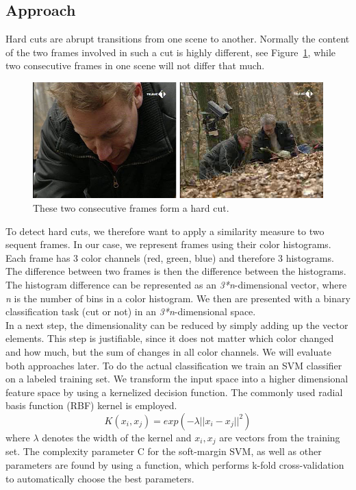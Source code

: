 \subsection{Approach}
\label{sec:hard_cut_approach}

Hard cuts are abrupt transitions from one scene to another. 
Normally the content of the two frames involved in such a cut is highly different, see Figure~\ref{fig:hard_cut_example}, while two consecutive frames in one scene will not differ that much. 

\begin{figure}
	\centering
	\includegraphics[scale=.7]{images/hard_cut_example.png}
	\caption{These two consecutive frames form a hard cut.}
	\label{fig:hard_cut_example}
\end{figure}

To detect hard cuts, we therefore want to apply a similarity measure to two sequent frames. 
In our case, we represent frames using their color histograms. 
Each frame has 3 color channels (red, green, blue) and therefore 3 histograms.
The difference between two frames is then the difference between the histograms.
The histogram difference can be represented as an \emph{3*n}-dimensional vector, where \emph{n} is the number of bins in a color histogram. 
We then are presented with a binary classification task (cut or not) in an \emph{3*n}-dimensional space. \\
In a next step, the dimensionality can be reduced by simply adding up the vector elements. 
This step is justifiable, since it does not matter which color changed and how much, but the sum of changes in all color channels. 
We will evaluate both approaches later.
To do the actual classification we train an SVM classifier on a labeled training set.
We transform the input space into a higher dimensional feature space by using a kernelized decision function. The commonly used radial basis function (RBF) kernel is employed. 
$$K(x_i,x_j) = exp(-\lambda || x_i - x_j ||^2)$$ 
where $\lambda$ denotes the width of the kernel and $x_i, x_j $ are vectors from the training set. The complexity parameter C for the soft-margin SVM, as well as other parameters are found by using a function, which performs k-fold cross-validation to automatically choose the best parameters.
